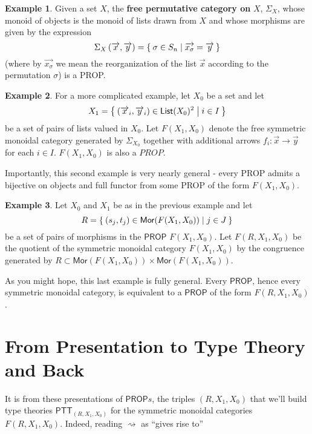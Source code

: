 \documentclass[pra,floatfix,
amsmath,superscriptaddress, 12pt]{article}
\theoremstyle{definition}
\newtheorem*{example}{Example}
\begin{document}
\begin{example}
Given a set $X$, the \textbf{free permutative category on} $X$, $\Sigma_{X}$, whose monoid of objects is the monoid of lists drawn from $X$ and whose morphisms are given by the expression
\[
    \Sigma_{X}\left(\overrightarrow{x},\overrightarrow{y}\right)
    =
    \Set{\sigma \in S_{n} | \overrightarrow{x_\sigma}=\overrightarrow{y}}
\]
(where by $\overrightarrow{x_\sigma}$ we mean the reorganization of the list $\overrightarrow{x}$ according to the permutation $\sigma$) is a \textsf{PROP}.
\end{example}

\begin{example}
For a more complicated example, let $X_0$ be a set and let \[X_1=\Set{(\overrightarrow{x}_i,\overrightarrow{y}_i) \in \mathsf{List}(X_0)^2| i \in I}\] be a set of pairs of lists valued in $X_0$. Let $F(X_1,X_0)$ denote the free symmetric monoidal category generated by $\Sigma_{X_0}$ together with additional arrows $f_{i}:\overrightarrow{x} \longrightarrow \overrightarrow{y}$ for each $i\in I$. $F(X_1,X_0)$ is also a $PROP$.
\end{example}

Importantly, this second example is very nearly general - every \textsf{PROP} admits a bijective on objects and full functor from some \textsf{PROP} of the form $F(X_1,X_0)$.

\begin{example}
 Let  $X_0$ and $X_1$ be as in the previous example and let
 \[
    R=\Set{ (s_j,t_j) \in \mathsf{Mor}(F(X_1,X_0)) | j \in J}
 \]
 be a set of pairs of morphisms in the $\mathsf{PROP}$ $F(X_1,X_0)$. Let $F(R,X_1,X_0)$ be the quotient of the symmetric monoidal category $F(X_1,X_0)$ by the congruence generated by $R \subset \mathsf{Mor}(F(X_1,X_0)) \times \mathsf{Mor}(F(X_1,X_0))$.
\end{example}

As you might hope, this last example is fully general. Every $\mathsf{PROP}$, hence every symmetric monoidal category, is equivalent to a $\mathsf{PROP}$ of the form $F(R,X_1,X_0)$.

\section{From Presentation to Type Theory and Back}

It is from these presentations of $\mathsf{PROP}s$, the triples $(R,X_1,X_0)$ that we'll build type theories $\mathsf{PTT}_{(R,X_1,X_0)}$ for the symmetric monoidal categories $F(R,X_1,X_0)$. Indeed, reading $\rightsquigarrow$ as ``gives rise to''
\end{document}
